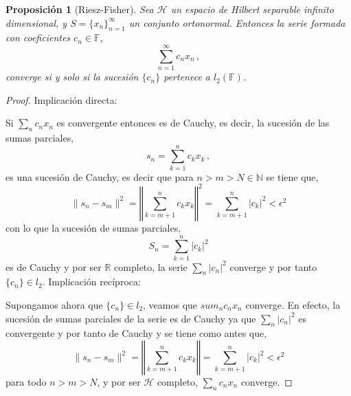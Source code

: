 \documentclass[12pt]{book}
\newtheorem{prop}{\bf Proposición}[chapter]
\def\NN{\mathbb{N}}
\def\RR{\mathbb{R}}
\def\FF{\mathbb{F}}
\newcommand{\abs}[1]{\lvert #1\rvert }
\newcommand{\norm}[1]{\lVert #1\rVert }
\newcommand{\Norm}[1]{\left\Vert #1\right\Vert }
\begin{document}
\begin{prop}[Riesz-Fisher] 
Sea $\mathcal{H}$ un espacio de Hilbert separable infinito dimensional,  y $S=\{x_n\}_{n=1}^\infty$ un conjunto ortonormal. Entonces  la serie formada  con coeficientes $c_n\in \FF$,
$$\sum_{n=1}^\infty c_n x_n\,,$$
converge si  y solo si la sucesión $\{c_n\}$ pertenece a  $l_2(\FF)$.
\end{prop}
\begin{proof}
Implicación directa:

Si $\sum_n c_n x_n$ es convergente entonces es de Cauchy, es decir,  la sucesión de las sumas parciales,
$$s_n=\sum_{k=1}^n c_k x_k\,,$$
es una sucesión de Cauchy, es decir que para $n>m>N\in \NN$ se tiene que,
$$\norm{s_n-s_m}^2=\Norm{\sum_{k=m+1}^n c_k x_k}^2=\sum_{k=m+1}^n \abs{c_k}^2<\epsilon^2$$
 con lo que la sucesión de sumas parciales,
 $$S_n=\sum_{k=1}^n \abs{c_k}^2$$
 es de Cauchy y por ser $\RR$ completo, la  serie $\sum_n\abs{c_n}^2$ converge y por tanto $\{c_n\} \in l_2$.
 Implicación recíproca:
 
 Supongamos ahora que $\{c_n\}\in l_2$, veamos que $sum_n c_n x_n$ converge. En efecto, la sucesión de sumas parciales de la serie es de Cauchy ya que $\sum_n \abs{c_n}^2$ es convergente y por tanto de Cauchy y se tiene  como antes que,
 $$\norm{s_n-s_m}^2=\Norm{\sum_{k=m+1}^n c_kx_k}=\sum_{k=m+1}^n\abs{c_k}^2<\epsilon^2$$
 para todo $n>m>N$, y por ser $\mathcal{H}$ completo,   $\sum_n c_n x_n$ converge. 
\end{proof}
 
 
\end{document}
